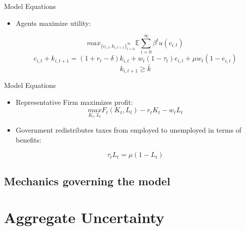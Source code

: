 \documentclass{beamer}
\begin{document}
\begin{frame}{Model Equations}
	\begin{itemize}
	
	\item {
	Agents maximize utility:
	}

\[ 
max_{\{{ c_{i,t}, k_{i,t+1} }\}_{t = 0}^{\infty}} {\mathbb{E}} \sum_{i=0}^{\infty} \beta^{t}  u(c_{i,t}) 
\]
 \[ 
 c_{i,t} + k_{i,t+1} = (1 + r_{t} - \delta) k_{i,t} + w_{t} (1 - \tau_{t})  e_{i,t} + \mu w_{t} (1 - e_{i,t})
 \]
  \[
  k_{i,t + 1} \geq \bar{k}
	\]


	\end{itemize}

\end{frame}

\begin{frame}{Model Equations}
	\begin{itemize}
	
	\item {
	Representative Firm maximizes profit:
	}
\[ 
\underset{K_{t},L_{t}}{max} F_{t}(K_{t},L_{t}) -r_{t}K_{t} - w_{t}L_{t}
\]

	\item {
	Government redistributes taxes from employed to unemployed in terms of benefits:
	}

\[ 
\tau_{t}L_{t} = \mu(1-L_{t})
\]

	\end{itemize}

\end{frame}


\subsection{Mechanics governing the model}


\section{Aggregate Uncertainty}
\subsection{}
\end{document}
